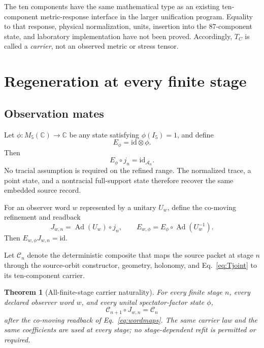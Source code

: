 \documentclass[11pt]{article}
\newtheorem{theorem}{Theorem}[section]
\theoremstyle{definition}
\theoremstyle{remark}
\newcommand{\cA}{\mathcal{A}}
\newcommand{\cC}{\mathcal{C}}
\newcommand{\Ad}{\operatorname{Ad}}
\begin{document}
The ten components have the same mathematical type as an existing ten-component metric-response interface in the larger unification program. Equality to that response, physical normalization, units, insertion into the 87-component state, and laboratory implementation have not been proved. Accordingly, $T_C$ is called a \emph{carrier}, not an observed metric or stress tensor.

\section{Regeneration at every finite stage}

\subsection{Observation mates}

Let $\phi:M_5(\mathbb C)\to\mathbb C$ be any state satisfying $\phi(I_5)=1$, and define
\begin{equation}\label{eq:obsmate}
 E_\phi=\mathrm{id}\otimes\phi.
\end{equation}
Then
\begin{equation}\label{eq:mateidentity}
 E_\phi\circ j_n=\mathrm{id}_{\cA_n}.
\end{equation}
No tracial assumption is required on the refined range. The normalized trace, a point state, and a nontracial full-support state therefore recover the same embedded source record.

For an observer word $w$ represented by a unitary $U_w$, define the co-moving refinement and readback
\begin{equation}\label{eq:wordmaps}
 J_{w,n}=\Ad(U_w)\circ j_n,
 \qquad
 E_{w,\phi}=E_\phi\circ\Ad(U_w^{-1}).
\end{equation}
Then $E_{w,\phi}J_{w,n}=\mathrm{id}$.

Let $\cC_n$ denote the deterministic composite that maps the source packet at stage $n$ through the source-orbit constructor, geometry, holonomy, and Eq.~\eqref{eq:Tjoint} to its ten-component carrier.

\begin{theorem}[All-finite-stage carrier naturality]\label{thm:x61}
For every finite stage $n$, every declared observer word $w$, and every unital spectator-factor state $\phi$,
\begin{equation}\label{eq:naturality}
 \cC_{n+1}\circ J_{w,n}=\cC_n
\end{equation}
after the co-moving readback of Eq.~\eqref{eq:wordmaps}. The same carrier law and the same coefficients are used at every stage; no stage-dependent refit is permitted or required.
\end{theorem}
\end{document}
